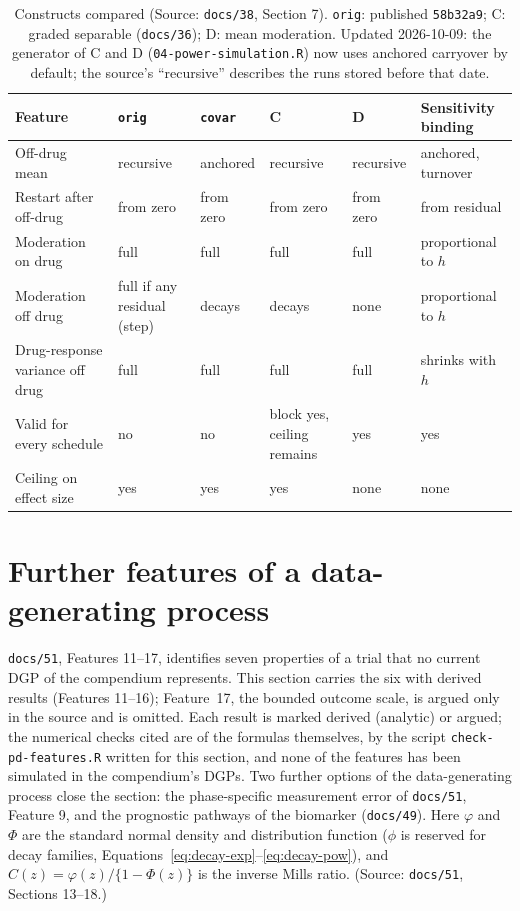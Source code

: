 \documentclass[11pt]{article}
\newcommand{\code}[1]{\texttt{#1}}
\begin{document}
\begin{table}[h]
\centering\small
\caption{Constructs compared (Source: \code{docs/38}, Section 7).
\code{orig}: published \code{58b32a9}; C: graded separable
(\code{docs/36}); D: mean moderation. Updated 2026-10-09: the
generator of C and D (\code{04-power-simulation.R}) now uses anchored
carryover by default; the source's ``recursive'' describes the runs
stored before that date.}
\label{tab:inve-pd-compare}
\begin{tabular}{@{}p{3.0cm}p{2.0cm}p{2.0cm}p{2.0cm}p{2.0cm}p{2.4cm}@{}}
\toprule
Feature & \code{orig} & \code{covar} & C & D & Sensitivity binding \\
\midrule
Off-drug mean & recursive & anchored & recursive & recursive & anchored, turnover \\
Restart after off-drug & from zero & from zero & from zero & from zero & from residual \\
Moderation on drug & full & full & full & full & proportional to $h$ \\
Moderation off drug & full if any residual (step) & decays & decays & none & proportional to $h$ \\
Drug-response variance off drug & full & full & full & full & shrinks with $h$ \\
Valid for every schedule & no & no & block yes, ceiling remains & yes & yes \\
Ceiling on effect size & yes & yes & yes & none & none \\
\bottomrule
\end{tabular}
\end{table}

\section{Further features of a data-generating process}
\label{sec:pd-features}

\code{docs/51}, Features 11--17, identifies seven properties of a trial
that no current DGP of the compendium represents. This section carries
the six with derived results (Features 11--16); Feature~17, the
bounded outcome scale, is argued only in the source and is omitted.
Each result is marked derived (analytic) or argued; the numerical
checks cited are of the formulas themselves, by the script
\code{check-pd-features.R} written for this section, and none of the
features has been simulated in the compendium's DGPs. Two further
options of the data-generating process close the section: the
phase-specific measurement error of \code{docs/51}, Feature 9, and the
prognostic pathways of the biomarker (\code{docs/49}). Here
$\varphi$ and $\Phi$ are the standard normal density and distribution
function ($\phi$ is reserved for decay families,
Equations~\eqref{eq:decay-exp}--\eqref{eq:decay-pow}), and
$C(z) = \varphi(z)/\{1 - \Phi(z)\}$ is the inverse Mills ratio.
(Source: \code{docs/51}, Sections 13--18.)
\end{document}
